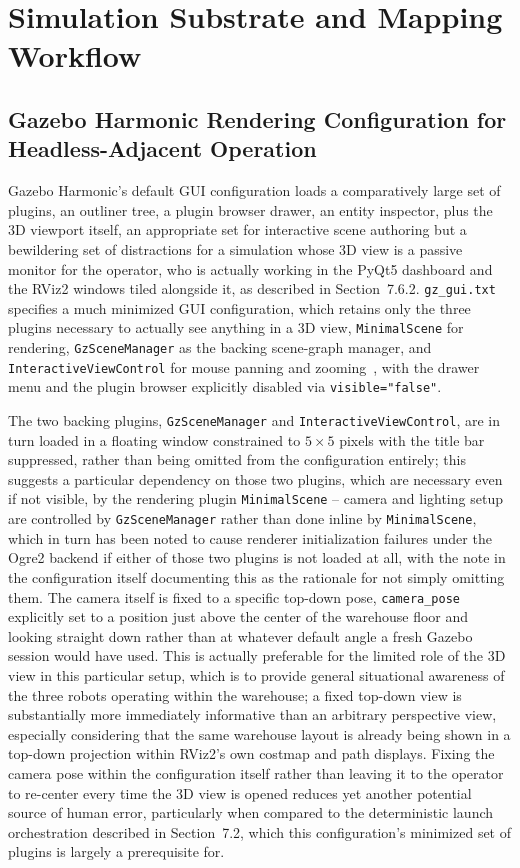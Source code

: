 \section{Simulation Substrate and Mapping Workflow}

\subsection{Gazebo Harmonic Rendering Configuration for Headless-Adjacent Operation}

Gazebo Harmonic's default GUI configuration loads a comparatively large set of plugins, an outliner tree, a plugin browser drawer, an entity inspector, plus the 3D viewport itself, an appropriate set for interactive scene authoring but a bewildering set of distractions for a simulation whose 3D view is a passive monitor for the operator, who is actually working in the PyQt5 dashboard and the RViz2 windows tiled alongside it, as described in Section~7.6.2. \texttt{gz\_gui.txt} specifies a much minimized GUI configuration, which retains only the three plugins necessary to actually see anything in a 3D view, \texttt{MinimalScene} for rendering, \texttt{GzSceneManager} as the backing scene-graph manager, and \texttt{InteractiveViewControl} for mouse panning and zooming~\cite{soriano2026benchmarking}, with the drawer menu and the plugin browser explicitly disabled via \texttt{visible="false"}.

The two backing plugins, \texttt{GzSceneManager} and \texttt{InteractiveViewControl}, are in turn loaded in a floating window constrained to $5\times5$ pixels with the title bar suppressed, rather than being omitted from the configuration entirely; this suggests a particular dependency on those two plugins, which are necessary even if not visible, by the rendering plugin \texttt{MinimalScene} -- camera and lighting setup are controlled by \texttt{GzSceneManager} rather than done inline by \texttt{MinimalScene}, which in turn has been noted to cause renderer initialization failures under the Ogre2 backend if either of those two plugins is not loaded at all, with the note in the configuration itself documenting this as the rationale for not simply omitting them. The camera itself is fixed to a specific top-down pose, \texttt{camera\_pose} explicitly set to a position just above the center of the warehouse floor and looking straight down rather than at whatever default angle a fresh Gazebo session would have used. This is actually preferable for the limited role of the 3D view in this particular setup, which is to provide general situational awareness of the three robots operating within the warehouse; a fixed top-down view is substantially more immediately informative than an arbitrary perspective view, especially considering that the same warehouse layout is already being shown in a top-down projection within RViz2's own costmap and path displays. Fixing the camera pose within the configuration itself rather than leaving it to the operator to re-center every time the 3D view is opened reduces yet another potential source of human error, particularly when compared to the deterministic launch orchestration described in Section~7.2, which this configuration's minimized set of plugins is largely a prerequisite for.

